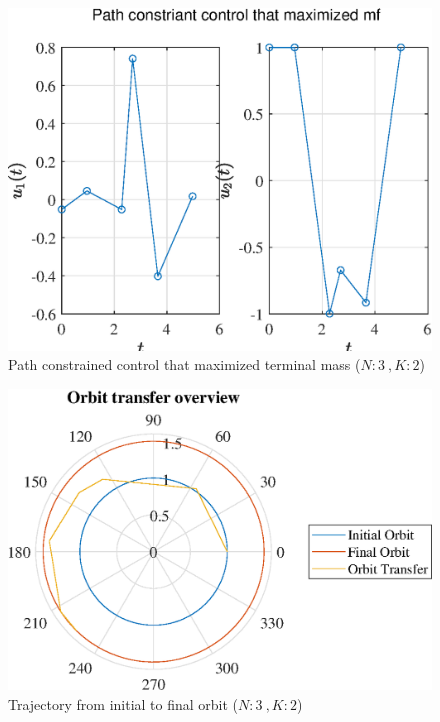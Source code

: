 \documentclass[]{article}
\begin{document}
	\begin{figure}
		\centering
		\includegraphics[scale=0.75]{path_N3_K2_C3_mf.eps}
		\caption{Path constrained control that maximized terminal mass (\(N:3\ , K:2\))}
		\label{fig:path_N3_K2_C3_mf}
	\end{figure}
	\begin{figure}
		\centering
		\includegraphics[scale=0.75]{orbit_N3_K2_C3_mf.eps}
		\caption{Trajectory from initial to final orbit (\(N:3\ , K:2\))}
		\label{fig:orbit_N3_K2_C3_mf}
	\end{figure}
\end{document}
